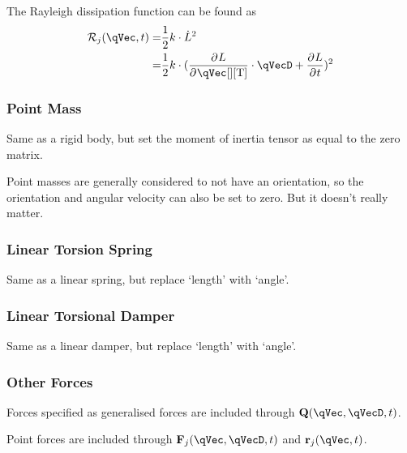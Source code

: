 \documentclass[11pt]{article}
\newcommand{\pD}[2]{
    \frac{\partial\mspace{1mu}#1}{\partial\mspace{1mu}#2}
}
\begin{document}
The Rayleigh dissipation function can be found as
\begin{align}
    \mathcal{R}_j(\qVec, t) =& \frac{1}{2} k \cdot \dot{L}^2 \nonumber\\
    =&\frac{1}{2} k \cdot (\pD{L}{\qVec[][\mathrm{T}]}\cdot\qVecD + \pD{L}{t})^2
\end{align}


\subsubsection{Point Mass} \label{ssec:d:elements:mass}
Same as a rigid body, but set the moment of inertia tensor as equal to the zero matrix.

Point masses are generally considered to not have an orientation, so the orientation and angular velocity can also be set to zero. But it doesn't really matter.


\subsubsection{Linear Torsion Spring} \label{ssec:d:elements:springR}
Same as a linear spring, but replace `length' with `angle'.


\subsubsection{Linear Torsional Damper} \label{ssec:d:elements:damperR}
Same as a linear damper, but replace `length' with `angle'.


\subsubsection{Other Forces} \label{ssec:d:elements:force}
Forces specified as generalised forces are included through $\mathbf{Q}(\qVec, \qVecD, t)$.

Point forces are included through $\mathbf{F}_j(\qVec, \qVecD, t)$ and $\mathbf{r}_j(\qVec, t)$.


\FloatBarrier
\clearpage
\printbibliography

\end{document}
